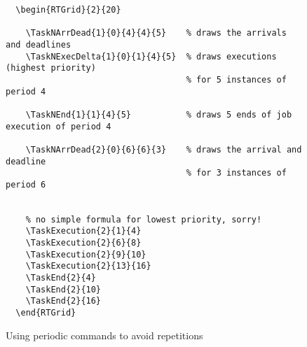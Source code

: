 \documentclass{article}
\begin{document}
\begin{figure}[!htbp]
  \centering
  \begin{RTGrid}{2}{20}
                                   
                                    


    
  \end{RTGrid}

\begin{verbatim}
  \begin{RTGrid}{2}{20}
                                   
    \TaskNArrDead{1}{0}{4}{4}{5}    % draws the arrivals and deadlines
    \TaskNExecDelta{1}{0}{1}{4}{5}  % draws executions (highest priority) 
                                    % for 5 instances of period 4 
                                    
    \TaskNEnd{1}{1}{4}{5}           % draws 5 ends of job execution of period 4

   	\TaskNArrDead{2}{0}{6}{6}{3}    % draws the arrival and deadline
                                    % for 3 instances of period 6 
	    
    
    % no simple formula for lowest priority, sorry!
    \TaskExecution{2}{1}{4}
    \TaskExecution{2}{6}{8}
    \TaskExecution{2}{9}{10}
    \TaskExecution{2}{13}{16} 
    \TaskEnd{2}{4}
    \TaskEnd{2}{10}
    \TaskEnd{2}{16}  
  \end{RTGrid}
\end{verbatim}
  \caption{Using periodic commands to avoid repetitions}
  \label{fig:ex1a}
\end{figure}
\end{document}
